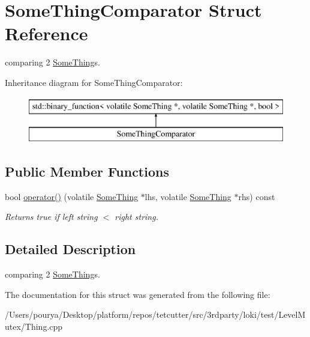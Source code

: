 \hypertarget{structSomeThingComparator}{}\section{Some\+Thing\+Comparator Struct Reference}
\label{structSomeThingComparator}


comparing 2 \hyperlink{classSomeThing}{Some\+Thing}\textquotesingle{}s.  


Inheritance diagram for Some\+Thing\+Comparator\+:\begin{figure}[H]
\begin{center}
\leavevmode
\includegraphics[height=2.000000cm]{structSomeThingComparator}
\end{center}
\end{figure}
\subsection*{Public Member Functions}
\begin{DoxyCompactItemize}
\item 
\hypertarget{structSomeThingComparator_aa738b166928555da5e33fef93239fe61}{}bool \hyperlink{structSomeThingComparator_aa738b166928555da5e33fef93239fe61}{operator()} (volatile \hyperlink{classSomeThing}{Some\+Thing} $\ast$lhs, volatile \hyperlink{classSomeThing}{Some\+Thing} $\ast$rhs) const \label{structSomeThingComparator_aa738b166928555da5e33fef93239fe61}

\begin{DoxyCompactList}\small\item\em Returns true if left string $<$ right string. \end{DoxyCompactList}\end{DoxyCompactItemize}


\subsection{Detailed Description}
comparing 2 \hyperlink{classSomeThing}{Some\+Thing}\textquotesingle{}s. 

The documentation for this struct was generated from the following file\+:\begin{DoxyCompactItemize}
\item 
/\+Users/pourya/\+Desktop/platform/repos/tetcutter/src/3rdparty/loki/test/\+Level\+Mutex/Thing.\+cpp\end{DoxyCompactItemize}

